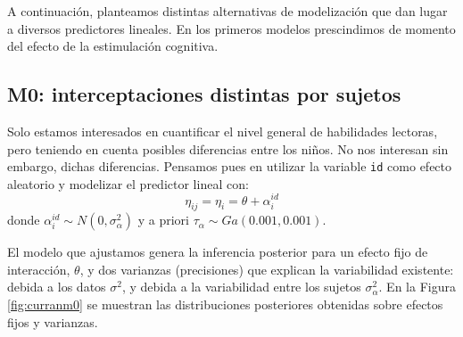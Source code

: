 \documentclass[
]{book}
\begin{document}
A continuación, planteamos distintas alternativas de modelización que dan lugar a diversos predictores lineales. En los primeros modelos prescindimos de momento del efecto de la estimulación cognitiva.

\hypertarget{m0-interceptaciones-distintas-por-sujetos}{%
\subsection{M0: interceptaciones distintas por sujetos}\label{m0-interceptaciones-distintas-por-sujetos}}

Solo estamos interesados en cuantificar el nivel general de habilidades lectoras, pero teniendo en cuenta posibles diferencias entre los niños. No nos interesan sin embargo, dichas diferencias. Pensamos pues en utilizar la variable \texttt{id} como efecto aleatorio y modelizar el predictor lineal con:
\[\eta_{ij}=\eta_i=\theta + \alpha_i^{id}\]
donde \(\alpha_i^{id} \sim N(0,\sigma_{\alpha}^2)\) y a priori \(\tau_{\alpha} \sim Ga(0.001,0.001)\).

El modelo que ajustamos genera la inferencia posterior para un efecto fijo de interacción, \(\theta\), y dos varianzas (precisiones) que explican la variabilidad existente: debida a los datos \(\sigma^2\), y debida a la variabilidad entre los sujetos \(\sigma_{\alpha}^2\). En la Figura \ref{fig:curranm0} se muestran las distribuciones posteriores obtenidas sobre efectos fijos y varianzas.
\end{document}
